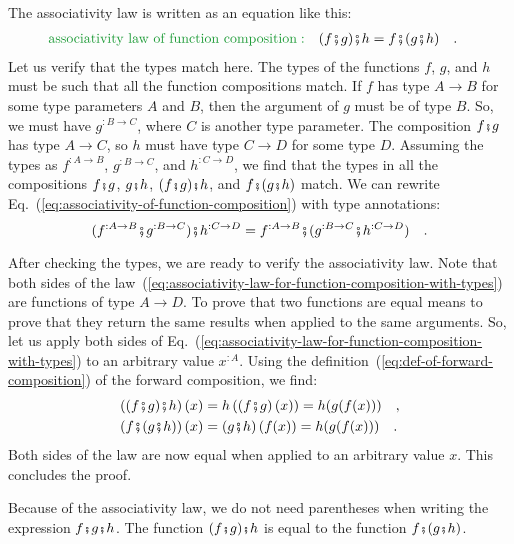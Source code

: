 The associativity law is written as an equation like this:
\begin{align}
{\color{greenunder}\text{associativity law of function composition}:}\quad & (f\bef g)\bef h=f\bef(g\bef h)\quad.\label{eq:associativity-of-function-composition}
\end{align}
Let us verify that the types match here. The types of the functions
$f$, $g$, and $h$ must be such that all the function compositions
match. If $f$ has type $A\rightarrow B$ for some type parameters
$A$ and $B$, then the argument of $g$ must be of type $B$. So,
we must have $g^{:B\rightarrow C}$, where $C$ is another type parameter.
The composition $f\bef g$ has type $A\rightarrow C$, so $h$ must
have type $C\rightarrow D$ for some type $D$. Assuming the types
as $f^{:A\rightarrow B}$, $g^{:B\rightarrow C}$, and $h^{:C\rightarrow D}$,
we find that the types in all the compositions $f\bef g$, $g\bef h$,
$(f\bef g)\bef h$, and $f\bef(g\bef h)$ match. We can rewrite Eq.~(\ref{eq:associativity-of-function-composition})
with type annotations: 
\begin{equation}
(f^{:A\rightarrow B}\bef g^{:B\rightarrow C})\bef h^{:C\rightarrow D}=f^{:A\rightarrow B}\bef(g^{:B\rightarrow C}\bef h^{:C\rightarrow D})\quad.\label{eq:associativity-law-for-function-composition-with-types}
\end{equation}

After checking the types, we are ready to verify the associativity
law. Note that both sides of the law~(\ref{eq:associativity-law-for-function-composition-with-types})
are functions of type $A\rightarrow D$. To prove that two functions
are equal means to prove that they return the same results when applied
to the same arguments. So, let us apply both sides of Eq.~(\ref{eq:associativity-law-for-function-composition-with-types})
to an arbitrary value $x^{:A}$. Using the definition~(\ref{eq:def-of-forward-composition})
of the forward composition, we find:
\begin{align*}
\left((f\bef g)\bef h\right)(x) & =h\left(\left(f\bef g\right)(x)\right)=h(g(f(x)))\quad,\\
\left(f\bef(g\bef h)\right)(x) & =\left(g\bef h\right)(f(x))=h(g(f(x)))\quad.
\end{align*}
Both sides of the law are now equal when applied to an arbitrary value
$x$. This concludes the proof.

Because of the associativity law, we do not need parentheses when
writing the expression $f\bef g\bef h$. The function $(f\bef g)\bef h$
is equal to the function $f\bef(g\bef h)$.

